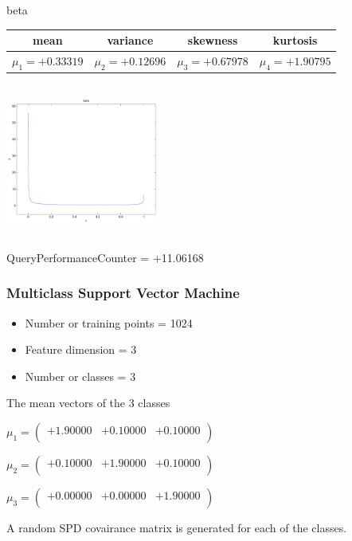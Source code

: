 \documentclass[9pt]{article}
\theoremstyle{plain}
\theoremstyle{definition}
\theoremstyle{remark}
\numberwithin{equation}{section}
\begin{document}
\newpage
beta \begin{tabular}{|c|c|c|c|}  mean & variance & skewness & kurtosis \\  \hline
$\mu_1 = +0.33319$ & $\mu_2 = +0.12696$ & $\mu_3 = +0.67978$ & $\mu_4 =+1.90795$ \\
\end{tabular}

\includegraphics[width=5cm,height=5cm]{beta.pdf}

QueryPerformanceCounter  =  +11.06168
\subsubsection{Multiclass Support Vector Machine }
\begin{itemize}
\item Number or training points = 1024
\item Feature dimension = 3
\item Number or classes = 3
\end{itemize}
{The mean vectors of the 3 classes}

$\mu_1 = \left(
\begin{array}{
ccc}
+1.90000 & +0.10000 & +0.10000 \\
\end{array}
\right)$ \newline 

$\mu_2 = \left(
\begin{array}{
ccc}
+0.10000 & +1.90000 & +0.10000 \\
\end{array}
\right)$ \newline 

$\mu_3 = \left(
\begin{array}{
ccc}
+0.00000 & +0.00000 & +1.90000 \\
\end{array}
\right)$ \newline 

A random SPD covairance matrix is generated for each of the classes.\newline
\end{document}
